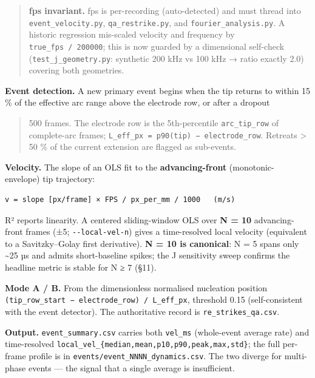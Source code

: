 \documentclass[
  11pt,
]{article}
\begin{document}
\begin{quote}
\textbf{fps invariant.} fps is per-recording (auto-detected) and must
thread into \texttt{event\_velocity.py}, \texttt{qa\_restrike.py}, and
\texttt{fourier\_analysis.py}. A historic regression mis-scaled velocity
and frequency by \texttt{true\_fps\ /\ 200000}; this is now guarded by a
dimensional self-check (\texttt{test\_j\_geometry.py}: synthetic 200 kHz
vs 100 kHz → ratio exactly 2.0) covering both geometries.
\end{quote}

\textbf{Event detection.} A new primary event begins when the tip
returns to within 15 \% of the effective arc range above the electrode
row, or after a dropout

\begin{quote}
500 frames. The electrode row is the 5th-percentile
\texttt{arc\_tip\_row} of complete-arc frames;
\texttt{L\_eff\_px\ =\ p90(tip)\ −\ electrode\_row}. Retreats
\textgreater{} 50 \% of the current extension are flagged as sub-events.
\end{quote}

\textbf{Velocity.} The slope of an OLS fit to the
\textbf{advancing-front} (monotonic- envelope) tip trajectory:

\begin{verbatim}
v = slope [px/frame] × FPS / px_per_mm / 1000   (m/s)
\end{verbatim}

R² reports linearity. A centered sliding-window OLS over \textbf{N = 10}
advancing- front frames (±5; \texttt{-\/-local-vel-n}) gives a
time-resolved local velocity (equivalent to a Savitzky--Golay first
derivative). \textbf{N = 10 is canonical}: N = 5 spans only
\textasciitilde25 µs and admits short-baseline spikes; the J sensitivity
sweep confirms the headline metric is stable for N ≥ 7 (§11).

\textbf{Mode A / B.} From the dimensionless normalised nucleation
position \texttt{(tip\_row\_start\ −\ electrode\_row)\ /\ L\_eff\_px},
threshold 0.15 (self-consistent with the event detector). The
authoritative record is \texttt{re\_strikes\_qa.csv}.

\textbf{Output.} \texttt{event\_summary.csv} carries both
\texttt{vel\_ms} (whole-event average rate) and time-resolved
\texttt{local\_vel\_\{median,mean,p10,p90,peak,max,std\}}; the full
per-frame profile is in \texttt{events/event\_NNNN\_dynamics.csv}. The
two diverge for multi-phase events --- the signal that a single average
is insufficient.
\end{document}
